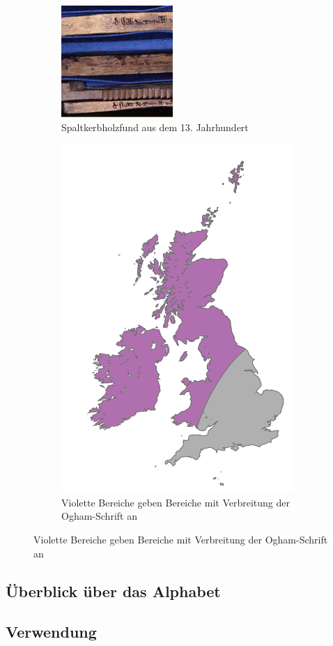 \documentclass[a4paper]{scrartcl}
\begin{document}
\begin{figure}[t]
  \begin{center}
    \begin{subfigure}[t]{0.5\textwidth}
      \begin{center}
        \includegraphics[width=120pt,height=120pt]{images/tally_stick.jpg}
        \caption{Spaltkerbholzfund aus dem 13. Jahrhundert~\cite{tally-sticks}}
        \label{fig:tally-stick}
      \end{center}
    \end{subfigure}
    \begin{subfigure}[t]{0.48\textwidth}
      \begin{center}
        \includegraphics{images/ogham_areas.pdf}
        \caption{Violette Bereiche geben Bereiche mit Verbreitung der Ogham-Schrift an}
      \end{center}
    \end{subfigure}
  \end{center}
\end{figure}



\subsection{Überblick über das Alphabet}
\subsection{Verwendung}

\sloppy\printbibliography
\end{document}
